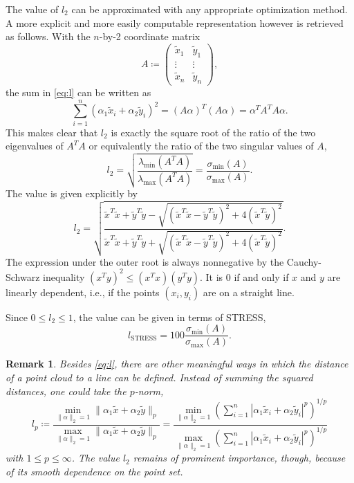 \documentclass{scrartcl}
\newtheorem*{remark}{Remark}
\theoremstyle{named}
\begin{document}
The value of $l_2$ can be approximated with any appropriate optimization method. A more
explicit and more easily computable representation however is retrieved as follows.
With the $n$-by-2 coordinate matrix
\[
  A \coloneqq \begin{pmatrix}
    \tilde{x}_1 & \tilde{y}_1\\
    \vdots & \vdots\\
    \tilde{x}_n & \tilde{y}_n
  \end{pmatrix},
\]
the sum in \eqref{eq:l} can be written as
\[
  \sum_{i=1}^n (\alpha_1 \tilde{x}_i + \alpha_2 \tilde{y}_i)^2
  = (A \alpha)^T (A \alpha)
  = \alpha^T A^T A \alpha.
\]
This makes clear that $l_2$ is exactly the square root of the ratio of the two
eigenvalues of $A^TA$ or equivalently the ratio of the two singular values of $A$,
\[
l_2
= \sqrt{
  \frac{
    \lambda_{\min}(A^T A)
  }{
    \lambda_{\max}(A^T A)
  }
}
= \frac{\sigma_{\min}(A)}{\sigma_{\max}(A)}.
\]
The value is given explicitly by
\begin{equation*}
  l_2 = \sqrt{
    \frac{
      \tilde{x}^T\tilde{x}
      + \tilde{y}^T\tilde{y}
      - \sqrt{(\tilde{x}^T\tilde{x} - \tilde{y}^T\tilde{y})^2 + 4 (\tilde{x}^T\tilde{y})^2}
    }{
      \tilde{x}^T\tilde{x}
      + \tilde{y}^T\tilde{y}
      + \sqrt{(\tilde{x}^T\tilde{x} - \tilde{y}^T\tilde{y})^2 + 4 (\tilde{x}^T\tilde{y})^2}
    }
    }.
\end{equation*}
The expression under the outer root is always nonnegative by the Cauchy-Schwarz
inequality $(x^Ty)^2 \le (x^Tx) (y^Ty)$. It is 0 if and only if $x$ and $y$ are linearly
dependent, i.e., if the points $(x_i, y_i)$ are on a straight line.

Since $0\le l_2\le 1$, the value can be given in terms of STRESS,
\begin{equation}\label{eq:lstress}
  l_\text{STRESS} = 100 \frac{\sigma_{\min}(A)}{\sigma_{\max}(A)}.
\end{equation}



\begin{remark}
Besides \eqref{eq:l}, there are other meaningful ways in which the distance of a point
cloud to a line can be defined. Instead of summing the squared distances, one could take
the $p$-norm,
\[
l_p
  \coloneqq
  \frac{
    \min_{\|\alpha\|_2=1} \|\alpha_1 \tilde{x} + \alpha_2\tilde{y}\|_p
  }{
    \max_{\|\alpha\|_2=1} \|\alpha_1 \tilde{x} + \alpha_2\tilde{y}\|_p
  }
  = \frac{
    \min_{\|\alpha\|_2=1}
  \left(\sum_{i=1}^n |\alpha_1 \tilde{x}_i + \alpha_2 \tilde{y}_i|^p\right)^{1/p}
}{
    \max_{\|\alpha\|_2=1}
  \left(\sum_{i=1}^n |\alpha_1 \tilde{x}_i + \alpha_2 \tilde{y}_i|^p\right)^{1/p}
}
\]
  with $1\le p \le \infty$.
  The value $l_2$ remains of prominent importance, though, because of its smooth
  dependence on the point set.
\end{remark}
\end{document}
